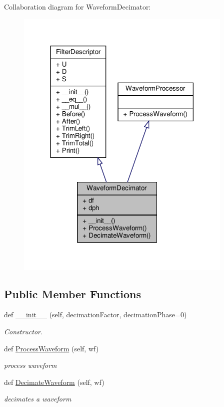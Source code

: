 Collaboration diagram for Waveform\+Decimator\+:
\nopagebreak
\begin{figure}[H]
\begin{center}
\leavevmode
\includegraphics[width=294pt]{classSignalIntegrity_1_1TimeDomain_1_1Filters_1_1WaveformDecimator_1_1WaveformDecimator__coll__graph}
\end{center}
\end{figure}
\subsection*{Public Member Functions}
\begin{DoxyCompactItemize}
\item 
def \hyperlink{classSignalIntegrity_1_1TimeDomain_1_1Filters_1_1WaveformDecimator_1_1WaveformDecimator_a82d726dbf6a2595a4939e36f886dc24b}{\+\_\+\+\_\+init\+\_\+\+\_\+} (self, decimation\+Factor, decimation\+Phase=0)
\begin{DoxyCompactList}\small\item\em Constructor. \end{DoxyCompactList}\item 
def \hyperlink{classSignalIntegrity_1_1TimeDomain_1_1Filters_1_1WaveformDecimator_1_1WaveformDecimator_ae09bec195c9cb1d5819e73b7be169b11}{Process\+Waveform} (self, wf)
\begin{DoxyCompactList}\small\item\em process waveform \end{DoxyCompactList}\item 
def \hyperlink{classSignalIntegrity_1_1TimeDomain_1_1Filters_1_1WaveformDecimator_1_1WaveformDecimator_af90fbe6c62fc6e0c9c21732e9c094a9a}{Decimate\+Waveform} (self, wf)
\begin{DoxyCompactList}\small\item\em decimates a waveform \end{DoxyCompactList}\end{DoxyCompactItemize}


